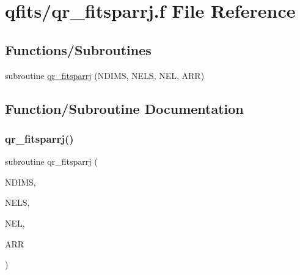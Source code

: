 \hypertarget{qr__fitsparrj_8f}{}\section{qfits/qr\+\_\+fitsparrj.f File Reference}
\label{qr__fitsparrj_8f}
\subsection*{Functions/\+Subroutines}
\begin{DoxyCompactItemize}
\item 
subroutine \hyperlink{qr__fitsparrj_8f_ae448d806da5ea98c6457d785eefb374a}{qr\+\_\+fitsparrj} (N\+D\+I\+MS, N\+E\+LS, N\+EL, A\+RR)
\end{DoxyCompactItemize}


\subsection{Function/\+Subroutine Documentation}
\mbox{\label{qr__fitsparrj_8f_ae448d806da5ea98c6457d785eefb374a}} 
\subsubsection{\texorpdfstring{qr\+\_\+fitsparrj()}{qr\_fitsparrj()}}
{\footnotesize\ttfamily subroutine qr\+\_\+fitsparrj (\begin{DoxyParamCaption}\item[{integer}]{N\+D\+I\+MS,  }\item[{integer, dimension(ndims)}]{N\+E\+LS,  }\item[{integer}]{N\+EL,  }\item[{integer, dimension(nel)}]{A\+RR }\end{DoxyParamCaption})}

